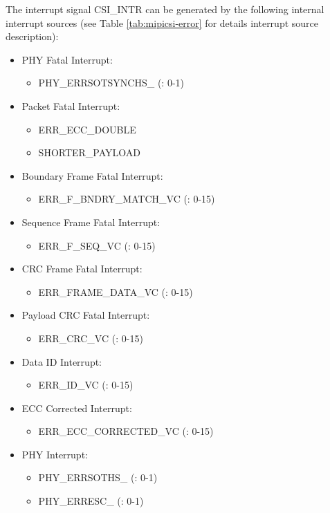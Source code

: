 \documentclass[main\_\_EN.tex]{subfiles}
\begin{document}
The interrupt signal CSI\_INTR can be generated by the following internal interrupt sources (see Table \ref{tab:mipicsi-error} \textit{} for details interrupt source description):
\begin{itemize}
    \item PHY Fatal Interrupt:
    \begin{itemize}
        \item PHY\_ERRSOTSYNCHS\_ (: 0-1)
    \end{itemize}
    \item Packet Fatal Interrupt:
    \begin{itemize}
        \item ERR\_ECC\_DOUBLE
        \item SHORTER\_PAYLOAD
    \end{itemize}    
    \item Boundary Frame Fatal Interrupt:
    \begin{itemize}
        \item ERR\_F\_BNDRY\_MATCH\_VC (: 0-15)
    \end{itemize}        
    \item Sequence Frame Fatal Interrupt:
    \begin{itemize}
        \item ERR\_F\_SEQ\_VC (: 0-15)
    \end{itemize}   
    \item CRC Frame Fatal Interrupt:
    \begin{itemize}
        \item ERR\_FRAME\_DATA\_VC (: 0-15)
    \end{itemize}      
    \item Payload CRC Fatal Interrupt:
    \begin{itemize}
        \item ERR\_CRC\_VC (: 0-15)
    \end{itemize}          
    \item Data ID Interrupt:
    \begin{itemize}
        \item ERR\_ID\_VC (: 0-15)
    \end{itemize}         
    \item ECC Corrected Interrupt:
    \begin{itemize}
        \item ERR\_ECC\_CORRECTED\_VC (: 0-15)
    \end{itemize}
    \item PHY Interrupt:
    \begin{itemize}
        \item PHY\_ERRSOTHS\_ (: 0-1)
        \item PHY\_ERRESC\_ (: 0-1)
    \end{itemize}
\end{itemize}
\end{document}

